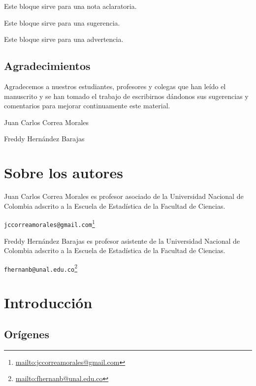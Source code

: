 \documentclass[10pt,]{krantz}
\renewcommand{\href}[2]{#2\footnote{\url{#1}}}
\let\BeginKnitrBlock\begin \let\EndKnitrBlock\end
\begin{document}
\BeginKnitrBlock{rmdnote}
Este bloque sirve para una nota aclaratoria.
\EndKnitrBlock{rmdnote}

\BeginKnitrBlock{rmdtip}
Este bloque sirve para una sugerencia.
\EndKnitrBlock{rmdtip}

\BeginKnitrBlock{rmdwarning}
Este bloque sirve para una advertencia.
\EndKnitrBlock{rmdwarning}

\section*{Agradecimientos}\label{agradecimientos}


Agradecemos a nuestros estudiantes, profesores y colegas que han leído
el manuscrito y se han tomado el trabajo de escribirnos dándonos sus
sugerencias y comentarios para mejorar continuamente este material.

\BeginKnitrBlock{flushright}
Juan Carlos Correa Morales

Freddy Hernández Barajas
\EndKnitrBlock{flushright}

\chapter*{Sobre los autores}\label{sobre-los-autores}


Juan Carlos Correa Morales es profesor asociado de la Universidad
Nacional de Colombia adscrito a la Escuela de Estadística de la Facultad
de Ciencias.

\href{mailto:jccorreamorales@gmail.com}{\nolinkurl{jccorreamorales@gmail.com}}

Freddy Hernández Barajas es profesor asistente de la Universidad
Nacional de Colombia adscrito a la Escuela de Estadística de la Facultad
de Ciencias.

\href{mailto:fhernanb@unal.edu.co}{\nolinkurl{fhernanb@unal.edu.co}}

\mainmatter

\chapter{\texorpdfstring{Introducción
\label{intro}}{Introducción }}\label{introduccion}

\section{Orígenes} \label{sec:origenes}
\end{document}
